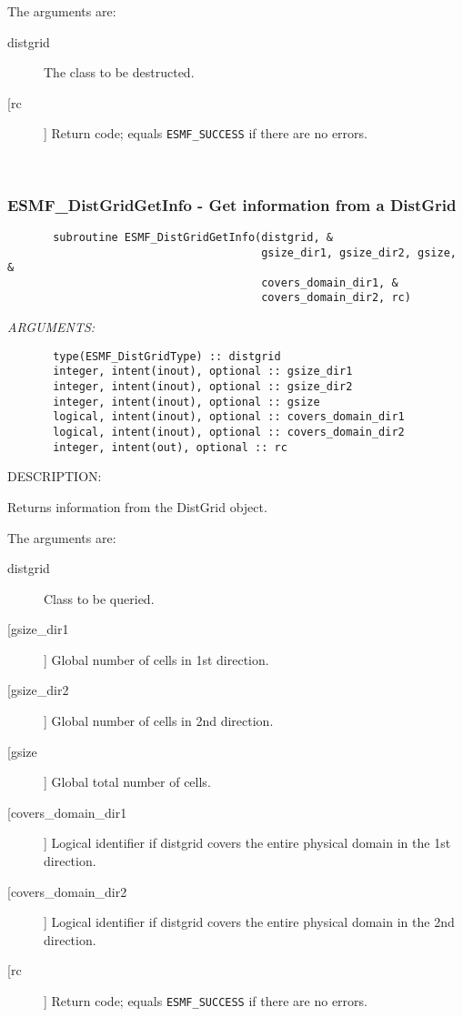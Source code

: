        The arguments are:
       \begin{description}
       \item[distgrid] 
            The class to be destructed.
       \item[[rc]] 
            Return code; equals {\tt ESMF\_SUCCESS} if there are no errors.
       \end{description}
   
 
\mbox{}\hrulefill\ 
 
\subsubsection{ESMF\_DistGridGetInfo - Get information from a DistGrid}


 
\begin{verbatim}       subroutine ESMF_DistGridGetInfo(distgrid, &
                                       gsize_dir1, gsize_dir2, gsize, &
                                       covers_domain_dir1, &
                                       covers_domain_dir2, rc)\end{verbatim}{\em ARGUMENTS:}
\begin{verbatim}       type(ESMF_DistGridType) :: distgrid
       integer, intent(inout), optional :: gsize_dir1
       integer, intent(inout), optional :: gsize_dir2
       integer, intent(inout), optional :: gsize
       logical, intent(inout), optional :: covers_domain_dir1
       logical, intent(inout), optional :: covers_domain_dir2
       integer, intent(out), optional :: rc              \end{verbatim}
{\sf DESCRIPTION:\\ }


       Returns information from the DistGrid object.
  
       The arguments are:
       \begin{description}
       \item[distgrid] 
            Class to be queried.
       \item[[gsize\_dir1]]
            Global number of cells in 1st direction.
       \item[[gsize\_dir2]]
            Global number of cells in 2nd direction.
       \item[[gsize]]
            Global total number of cells.
       \item[[covers\_domain\_dir1]]
            Logical identifier if distgrid covers the entire physical domain
            in the 1st direction.
       \item[[covers\_domain\_dir2]]
            Logical identifier if distgrid covers the entire physical domain
            in the 2nd direction.
       \item[[rc]] 
            Return code; equals {\tt ESMF\_SUCCESS} if there are no errors.
       \end{description}
   
